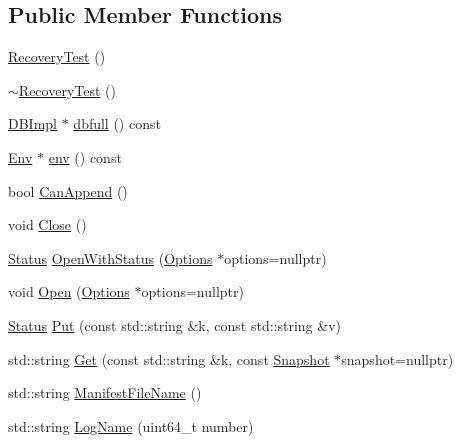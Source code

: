 \subsection*{Public Member Functions}
\begin{DoxyCompactItemize}
\item 
\mbox{\hyperlink{classleveldb_1_1_recovery_test_a14ee3aa377807ae74d5b56ed879368c4}{Recovery\+Test}} ()
\item 
\mbox{\hyperlink{classleveldb_1_1_recovery_test_acf396d9c48b2a5bdc1ed298210da1ac3}{$\sim$\+Recovery\+Test}} ()
\item 
\mbox{\hyperlink{classleveldb_1_1_d_b_impl}{D\+B\+Impl}} $\ast$ \mbox{\hyperlink{classleveldb_1_1_recovery_test_a5b0e79e644c07cd5e1a130268e93c35e}{dbfull}} () const
\item 
\mbox{\hyperlink{classleveldb_1_1_env}{Env}} $\ast$ \mbox{\hyperlink{classleveldb_1_1_recovery_test_a1e7db47a1e8abe79a30b6f009b6877b1}{env}} () const
\item 
bool \mbox{\hyperlink{classleveldb_1_1_recovery_test_a7f2b97d648d2eb95bd1c9c29697e3389}{Can\+Append}} ()
\item 
void \mbox{\hyperlink{classleveldb_1_1_recovery_test_a65077ffc562d9d4c5434166068836cbb}{Close}} ()
\item 
\mbox{\hyperlink{classleveldb_1_1_status}{Status}} \mbox{\hyperlink{classleveldb_1_1_recovery_test_a24c107441e4cd205302496825eb6cef7}{Open\+With\+Status}} (\mbox{\hyperlink{structleveldb_1_1_options}{Options}} $\ast$options=nullptr)
\item 
void \mbox{\hyperlink{classleveldb_1_1_recovery_test_ada3cbb27c8b7dd9eb4e0be43a476bb2e}{Open}} (\mbox{\hyperlink{structleveldb_1_1_options}{Options}} $\ast$options=nullptr)
\item 
\mbox{\hyperlink{classleveldb_1_1_status}{Status}} \mbox{\hyperlink{classleveldb_1_1_recovery_test_ad5b3e5d410f452814a0c47b195bda9ff}{Put}} (const std\+::string \&k, const std\+::string \&v)
\item 
std\+::string \mbox{\hyperlink{classleveldb_1_1_recovery_test_a296ba88823b34d714bb7c74ed6d83810}{Get}} (const std\+::string \&k, const \mbox{\hyperlink{classleveldb_1_1_snapshot}{Snapshot}} $\ast$snapshot=nullptr)
\item 
std\+::string \mbox{\hyperlink{classleveldb_1_1_recovery_test_a544166c64a5b786612230973ce510eaa}{Manifest\+File\+Name}} ()
\item 
std\+::string \mbox{\hyperlink{classleveldb_1_1_recovery_test_a1de129c9b097649c0c4349882e536d77}{Log\+Name}} (uint64\+\_\+t number)

\end{DoxyCompactItemize}
